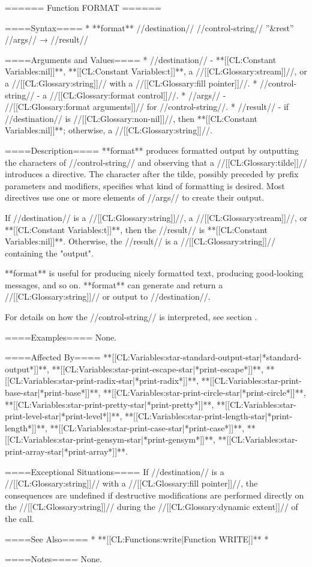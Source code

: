 ====== Function FORMAT ======

====Syntax====
  * **format** //destination// //control-string// ''&rest'' //args// → //result//

====Arguments and Values====
  * //destination// - **[[CL:Constant Variables:nil]]**, **[[CL:Constant Variables:t]]**, a //[[CL:Glossary:stream]]//, or a //[[CL:Glossary:string]]// with a //[[CL:Glossary:fill pointer]]//.
  * //control-string// - a //[[CL:Glossary:format control]]//.
  * //args// - //[[CL:Glossary:format arguments]]// for //control-string//.
  * //result// - if //destination// is //[[CL:Glossary:non-nil]]//, then **[[CL:Constant Variables:nil]]**; otherwise, a //[[CL:Glossary:string]]//.

====Description====
**format** produces formatted output by outputting the characters of //control-string// and observing that a //[[CL:Glossary:tilde]]// introduces a directive. The character after the tilde, possibly preceded by prefix parameters and modifiers, specifies what kind of formatting is desired. Most directives use one or more elements of //args// to create their output.

If //destination// is a //[[CL:Glossary:string]]//, a //[[CL:Glossary:stream]]//, or **[[CL:Constant Variables:t]]**, then the //result// is **[[CL:Constant Variables:nil]]**. Otherwise, the //result// is a //[[CL:Glossary:string]]// containing the "output".

**format** is useful for producing nicely formatted text, producing good-looking messages, and so on. **format** can generate and return a //[[CL:Glossary:string]]// or output to //destination//.

For details on how the //control-string// is interpreted, see section {\secref\FormattedOutput}.

====Examples====
None.

====Affected By====
**[[CL:Variables:star-standard-output-star|*standard-output*]]**, **[[CL:Variables:star-print-escape-star|*print-escape*]]**, **[[CL:Variables:star-print-radix-star|*print-radix*]]**, **[[CL:Variables:star-print-base-star|*print-base*]]**, **[[CL:Variables:star-print-circle-star|*print-circle*]]**, **[[CL:Variables:star-print-pretty-star|*print-pretty*]]**, **[[CL:Variables:star-print-level-star|*print-level*]]**, **[[CL:Variables:star-print-length-star|*print-length*]]**, **[[CL:Variables:star-print-case-star|*print-case*]]**, **[[CL:Variables:star-print-gensym-star|*print-gensym*]]**, **[[CL:Variables:star-print-array-star|*print-array*]]**.

====Exceptional Situations====
If //destination// is a //[[CL:Glossary:string]]// with a //[[CL:Glossary:fill pointer]]//, the consequences are undefined if destructive modifications are performed directly on the //[[CL:Glossary:string]]// during the //[[CL:Glossary:dynamic extent]]// of the call.

====See Also====
  * **[[CL:Functions:write|Function WRITE]]**
  * {\secref\ImplementationDefinedScripts}

====Notes====
None.

 
